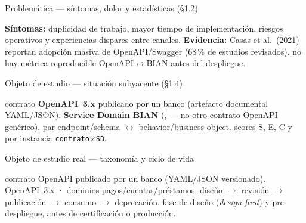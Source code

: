 \documentclass[aspectratio=169,11pt,spanish]{beamer}
\begin{document}
\begin{frame}{Problemática --- síntomas, dolor y estadísticas (§1.2)}
  \vspace{0.1em}
  \begin{planpanel}
  \small
  \textbf{Síntomas:} duplicidad de trabajo, mayor tiempo de implementación, riesgos operativos y experiencias dispares entre canales. \textbf{Evidencia:} Casas et al.\ (2021) reportan adopción masiva de OpenAPI/Swagger (68\,\% de estudios revisados).  no hay métrica reproducible OpenAPI$\leftrightarrow$BIAN antes del despliegue.
  \end{planpanel}
\end{frame}

\begin{frame}{Objeto de estudio --- situación subyacente (§1.4)}
  \vspace{0.15em}
  \begin{planpanel}
  \small
   contrato \textbf{OpenAPI~3.x} publicado por un banco (artefacto documental YAML/JSON).  \textbf{Service Domain BIAN} (\Behavior{}, \BusinessObject{} --- no otro contrato OpenAPI genérico).  par endpoint/schema $\leftrightarrow$ behavior/business object.  scores S, E, C y \AlignmentScore{} por instancia \texttt{contrato$\times$SD}.
  \end{planpanel}
\end{frame}

\begin{frame}{Objeto de estudio real --- taxonomía y ciclo de vida}
  \vspace{0.12em}
  \begin{planpanel}
  \small
   contrato OpenAPI publicado por un banco (YAML/JSON versionado).  OpenAPI~3.x · dominios pagos/cuentas/préstamos.  diseño $\rightarrow$ revisión $\rightarrow$ publicación $\rightarrow$ consumo $\rightarrow$ deprecación.  fase de diseño (\textit{design-first}) y pre-despliegue, antes de certificación o producción.
  \end{planpanel}
\end{frame}
\end{document}
